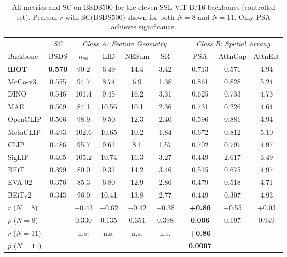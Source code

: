 \documentclass[runningheads]{llncs}
\begin{document}
\begin{table}[H]
\centering
\caption{All metrics and SC on BSDS500 for the eleven SSL ViT-B/16 backbones (controlled set). Pearson $r$ with SC(BSDS500) shown for both $N=8$ and $N=11$. Only PSA achieves significance.}
\label{tab:all_metrics}
\small
\begin{tabular}{l c cccc c ccc}
\toprule
 & \textit{SC} & \multicolumn{4}{c}{\textit{Class A: Feature Geometry}} & & \multicolumn{3}{c}{\textit{Class B: Spatial Arrang.}} \\
\cmidrule(lr){2-2} \cmidrule(lr){3-6} \cmidrule(lr){8-10}
Backbone & BSDS & $n_{80}$ & LID & NESum & SR & & PSA & AttnGap & AttnEnt \\
\midrule
\textbf{iBOT}    & \textbf{0.570} & 90.2  & 6.49  & 14.4 & 3.42 & & 0.713 & 0.571 & 4.94 \\
MoCo-v3  & 0.555 & 94.7  & 8.74  & 6.9  & 1.38 & & 0.861 & 0.828 & 5.24 \\
DINO     & 0.546 & 101.4 & 9.45  & 16.2 & 3.31 & & 0.625 & 0.733 & 4.73 \\
MAE      & 0.509 & 84.1  & 10.56 & 10.1 & 2.36 & & 0.731 & 0.226 & 4.64 \\
OpenCLIP & 0.506 & 98.9  & 9.50  & 12.3 & 2.40 & & 0.596 & 0.881 & 4.94 \\
MetaCLIP & 0.493 & 102.6 & 10.65 & 10.2 & 1.84 & & 0.672 & 0.812 & 5.10 \\
CLIP     & 0.486 & 95.7  & 9.61  & 8.1  & 1.57 & & 0.702 & 0.797 & 4.97 \\
SigLIP   & 0.405 & 105.2 & 10.74 & 16.3 & 3.27 & & 0.449 & 2.617 & 3.49 \\
BEiT     & 0.399 & 80.0  & 9.31  & 14.2 & 3.46 & & 0.515 & 0.675 & 4.97 \\
EVA-02   & 0.376 & 85.3  & 6.80  & 12.9 & 2.86 & & 0.479 & 0.518 & 4.71 \\
BEiTv2   & 0.343 & 96.0  & 10.41 & 13.8 & 2.77 & & 0.449 & 0.307 & 4.93 \\
\midrule
\multicolumn{1}{l}{$r$ ($N\!=\!8$)}  & & $-$0.43 & $-$0.62 & $-$0.42 & $-$0.38 & & \textbf{+0.86} & +0.55 & +0.03 \\
\multicolumn{1}{l}{$p$ ($N\!=\!8$)}  & & 0.330 & 0.135 & 0.351 & 0.398 & & \textbf{0.006} & 0.197 & 0.949 \\
\multicolumn{1}{l}{$r$ ($N\!=\!11$)} & & n.s. & n.s. & n.s. & n.s. & & \textbf{+0.86} & & \\
\multicolumn{1}{l}{$p$ ($N\!=\!11$)} & & & & & & & \textbf{0.0007} & & \\
\bottomrule
\end{tabular}
\vspace{-10pt}
\end{table}
\end{document}
